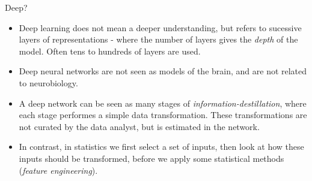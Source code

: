 \documentclass[
  10pt,
  ignorenonframetext,
]{beamer}
\providecommand{\tightlist}{%
  \setlength{\itemsep}{0pt}\setlength{\parskip}{0pt}}
\begin{document}
\begin{frame}
\begin{block}{Deep?}
\protect\hypertarget{deep}{}
\(~\)

\begin{itemize}
\tightlist
\item
  Deep learning does not mean a deeper understanding, but refers to
  sucessive layers of representations - where the number of layers gives
  the \emph{depth} of the model. Often tens to hundreds of layers are
  used.
\end{itemize}

\vspace{2mm}

\begin{itemize}
\tightlist
\item
  Deep neural networks are not seen as models of the brain, and are not
  related to neurobiology.
\end{itemize}

\vspace{2mm}

\begin{itemize}
\tightlist
\item
  A deep network can be seen as many stages of
  \emph{information-destillation}, where each stage performes a simple
  data transformation. These transformations are not curated by the data
  analyst, but is estimated in the network.
\end{itemize}

\vspace{2mm}

\begin{itemize}
\tightlist
\item
  In contrast, in statistics we first select a set of inputs, then look
  at how these inputs should be transformed, before we apply some
  statistical methods (\emph{feature engineering}).
\end{itemize}
\end{block}
\end{frame}
\end{document}
